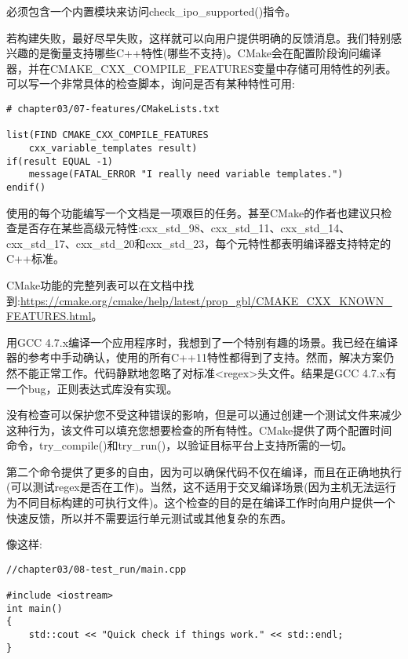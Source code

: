 必须包含一个内置模块来访问check\_ipo\_supported()指令。


若构建失败，最好尽早失败，这样就可以向用户提供明确的反馈消息。我们特别感兴趣的是衡量支持哪些C++特性(哪些不支持)。CMake会在配置阶段询问编译器，并在CMAKE\_CXX\_COMPILE\_FEATURES变量中存储可用特性的列表。可以写一个非常具体的检查脚本，询问是否有某种特性可用:

\begin{lstlisting}[style=styleCMake]
# chapter03/07-features/CMakeLists.txt

list(FIND CMAKE_CXX_COMPILE_FEATURES
	cxx_variable_templates result)
if(result EQUAL -1)
	message(FATAL_ERROR "I really need variable templates.")
endif()
\end{lstlisting}

使用的每个功能编写一个文档是一项艰巨的任务。甚至CMake的作者也建议只检查是否存在某些高级元特性:cxx\_std\_98、cxx\_std\_11、cxx\_std\_14、cxx\_std\_17、cxx\_std\_20和cxx\_std\_23，每个元特性都表明编译器支持特定的C++标准。

CMake功能的完整列表可以在文档中找到:\url{https://cmake.org/cmake/help/latest/prop_gbl/CMAKE_CXX_KNOWN_ FEATURES.html}。


用GCC 4.7.x编译一个应用程序时，我想到了一个特别有趣的场景。我已经在编译器的参考中手动确认，使用的所有C++11特性都得到了支持。然而，解决方案仍然不能正常工作。代码静默地忽略了对标准<regex>头文件。结果是GCC 4.7.x有一个bug，正则表达式库没有实现。

没有检查可以保护您不受这种错误的影响，但是可以通过创建一个测试文件来减少这种行为，该文件可以填充您想要检查的所有特性。CMake提供了两个配置时间命令，try\_compile()和try\_run()，以验证目标平台上支持所需的一切。

第二个命令提供了更多的自由，因为可以确保代码不仅在编译，而且在正确地执行(可以测试regex是否在工作)。当然，这不适用于交叉编译场景(因为主机无法运行为不同目标构建的可执行文件)。这个检查的目的是在编译工作时向用户提供一个快速反馈，所以并不需要运行单元测试或其他复杂的东西。

像这样:

\begin{lstlisting}[style=styleCXX]
//chapter03/08-test_run/main.cpp

#include <iostream>
int main()
{
	std::cout << "Quick check if things work." << std::endl;
}
\end{lstlisting}

